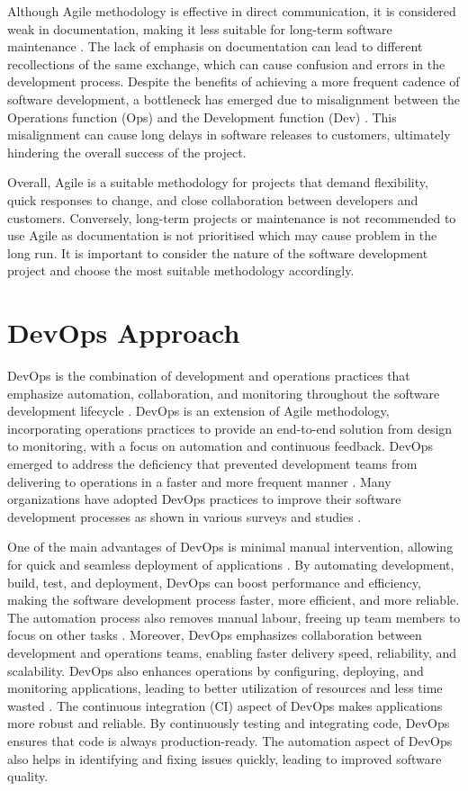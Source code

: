Although Agile methodology is effective in direct communication, it is considered weak in documentation, making it less suitable for long-term software maintenance \cite{aaa, koch}. The lack of emphasis on documentation can lead to different recollections of the same exchange, which can cause confusion and errors in the development process. Despite the benefits of achieving a more frequent cadence of software development, a bottleneck has emerged due to misalignment between the Operations function (Ops) and the Development function (Dev) \cite{hlrf}. This misalignment can cause long delays in software releases to customers, ultimately hindering the overall success of the project.

Overall, Agile is a suitable methodology for projects that demand flexibility, quick responses to change, and close collaboration between developers and customers. Conversely, long-term projects or maintenance is not recommended to use Agile as documentation is not prioritised which may cause problem in the long run. It is important to consider the nature of the software development project and choose the most suitable methodology accordingly. 

\section{DevOps Approach}
DevOps is the combination of development and operations practices that emphasize automation, collaboration, and monitoring throughout the software development lifecycle \cite{joakim}. DevOps is an extension of Agile methodology, incorporating operations practices to provide an end-to-end solution from design to monitoring, with a focus on automation and continuous feedback. DevOps emerged to address the deficiency that prevented development teams from delivering to operations in a faster and more frequent manner \cite{hlrf}. Many organizations have adopted DevOps practices to improve their software development processes as shown in various surveys and studies \cite{spj}.

One of the main advantages of DevOps is minimal manual intervention, allowing for quick and seamless deployment of applications \cite{spj}. By automating development, build, test, and deployment, DevOps can boost performance and efficiency, making the software development process faster, more efficient, and more reliable. The automation process also removes manual labour, freeing up team members to focus on other tasks \cite{joakim}. Moreover, DevOps emphasizes collaboration between development and operations teams, enabling faster delivery speed, reliability, and scalability. DevOps also enhances operations by configuring, deploying, and monitoring applications, leading to better utilization of resources and less time wasted \cite{os}. The continuous integration (CI) aspect of DevOps makes applications more robust and reliable. By continuously testing and integrating code, DevOps ensures that code is always production-ready. The automation aspect of DevOps also helps in identifying and fixing issues quickly, leading to improved software quality.

